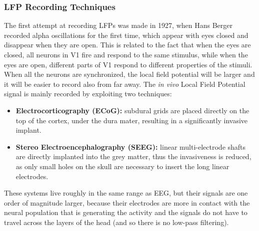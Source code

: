 \subsubsection{LFP Recording Techniques}
The first attempt at recording LFPs was made in 1927, when Hans Berger recorded alpha
oscillations for the first time, which appear with eyes closed and disappear when
they are open. This is related to the fact that when the eyes are closed, all neurons
in V1 fire and respond to the same stimulus, while when the eyes are open, different
parts of V1 respond to different properties of the stimuli. When all the neurons are
synchronized, the local field potential will be larger and it will be easier to
record also from far away. The \textit{in vivo} Local Field Potential signal is mainly
recorded by exploiting two techniques:
\begin{itemize}
    \item \textbf{Electrocorticography (ECoG):} subdural grids are placed directly on
          the top of the cortex, under the dura mater, resulting in a significantly
          invasive implant.
    \item \textbf{Stereo Electroencephalography (SEEG):} linear multi-electrode shafts
          are directly implanted into the grey matter, thus the invasiveness is reduced,
          as only small holes on the skull are necessary to insert the long linear electrodes.
\end{itemize}
These systems live roughly in the same range as EEG, but their signals are one order of
magnitude larger, because their electrodes are more in contact with the neural population
that is generating the activity and the signals do not have to travel across the layers of
the head (and so there is no low-pass filtering).

